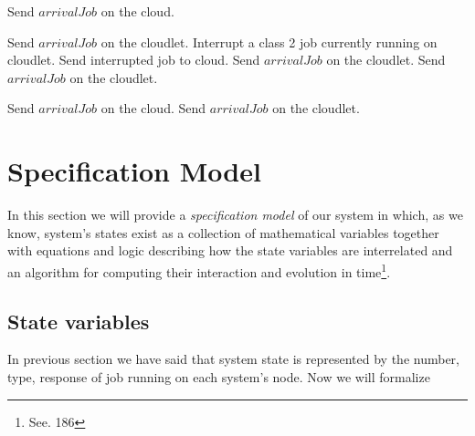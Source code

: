 \documentclass[10pt,a4paper]{article}
\begin{document}
\begin{algorithm}
\caption{}\label{alg:accessControlAlgorithm2}
\begin{algorithmic}[1]




	\State Send $\textit{arrivalJob}$ on the cloud.

	\State Send $\textit{arrivalJob}$ on the cloudlet.
	\State Interrupt a class 2 job currently running on cloudlet.
	\State Send interrupted job to cloud.
	\State Send $\textit{arrivalJob}$ on the cloudlet.
\Else 	
 	\State Send $\textit{arrivalJob}$ on the cloudlet.
\EndIf



\Else 

	\State Send $\textit{arrivalJob}$ on the cloud.
\Else 	
 	\State Send $\textit{arrivalJob}$ on the cloudlet.
\EndIf

\EndIf

\EndFunction

\end{algorithmic}
\end{algorithm}

















\newpage
\section{Specification  Model}

In this section we will provide a \textit{specification model} of our system in which, as we know, system's states exist as a collection of mathematical variables together with equations and logic describing how the state variables are interrelated and an algorithm for computing their interaction and evolution in time\footnote{See. 186}.

\subsection{State variables}

In previous section we have said that system state is represented by the number, type, response of job running on each system's node. Now we will formalize 
\end{document}
